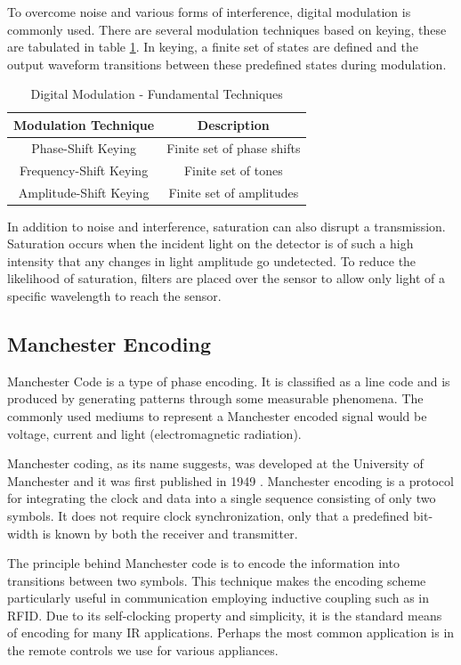 To overcome noise and various forms of interference, digital modulation is commonly used. There are several modulation techniques based on keying, these are tabulated in table \ref{tbl:types_of_keying}. In keying, a finite set of states are defined and the output waveform transitions between these predefined states during modulation.

\begin{table}[H]
	\centering
	\begin{tabular}{cc}
		\hline
		\textbf{Modulation Technique} & \textbf{Description} \\ \hline
		Phase-Shift Keying & Finite set of phase shifts \\ \hline
		Frequency-Shift Keying & Finite set of tones \\ \hline
		Amplitude-Shift Keying & Finite set of amplitudes \\ \hline
	\end{tabular}
	\caption{Digital Modulation - Fundamental Techniques}
	\label{tbl:types_of_keying}
\end{table}


In addition to noise and interference, saturation can also disrupt a transmission. Saturation occurs when the incident light on the detector is of such a high intensity that any changes in light amplitude go undetected. To reduce the likelihood of saturation, filters are placed over the sensor to allow only light of a specific wavelength to reach the sensor.



\subsection{Manchester Encoding}
\label{sec:manchester_encoding}
Manchester Code is a type of phase encoding. It is classified as a line code and is produced by generating patterns through some measurable phenomena. The commonly used mediums to represent a Manchester encoded signal would be voltage, current and light (electromagnetic radiation).

Manchester coding, as its name suggests, was developed at the University of Manchester and it was first published in 1949 \cite{Jameel2019}. Manchester encoding is a protocol for integrating the clock and data into a single sequence consisting of only two symbols. It does not require clock synchronization, only that a predefined bit-width is known by both the receiver and transmitter. 

The principle behind Manchester code is to encode the information into transitions between two symbols. This technique makes the encoding scheme particularly useful in communication employing inductive coupling such as in RFID. Due to its self-clocking property and simplicity, it is the standard means of encoding for many IR applications. Perhaps the most common application is in the remote controls we use for various appliances.

